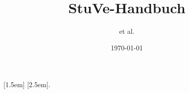 \title{StuVe-Handbuch}
\date{\today}
\author{et al.}

\usepackage[utf8]{inputenc}
\usepackage[T1]{fontenc}					%
\usepackage{lmodern}						%
\renewcommand{\familydefault}{\sfdefault}
\usepackage[ngerman]{babel}					%

\usepackage{geometry}
\usepackage{layout}							%
\usepackage{totcount}						%

\usepackage[final]{pdfpages}
\usepackage{graphicx}



\addto\captionsngerman{\renewcommand{\chaptername}{Teil}}

\usepackage{titlesec}
\usepackage{fancyhdr}

\renewcommand*{\chaptermark}[1]{ \markboth{\thechapter: ##1}{} }%


\titleformat{\chapter}[display]{\normalfont\huge\bfseries}{\flushright \chaptertitlename\ \thechapter}{5pt}{\flushright \Huge}

\makeatletter
\newcommand*{\toccontents}{\@starttoc{toc}}
\makeatother

\usepackage{titletoc}

[1.5em]{\small}{\contentslabel{1em}}{}{\contentspage}
[2.5em]{\footnotesize}{\contentslabel{1em}}{}{\titlerule*[0.3pc].{}\contentspage}



